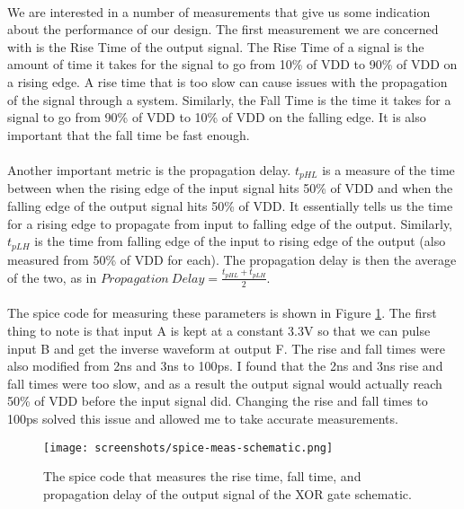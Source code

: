 \documentclass{article}
\begin{document}
  \paragraph{}
  We are interested in a number of measurements that give us some indication about the performance of our design. The first measurement we are concerned with is the Rise Time of the output signal. The Rise Time of a signal is the amount of time it takes for the signal to go from 10\% of VDD to 90\% of VDD on a rising edge. A rise time that is too slow can cause issues with the propagation of the signal through a system. Similarly, the Fall Time is the time it takes for a signal to go from 90\% of VDD to 10\% of VDD on the falling edge. It is also important that the fall time be fast enough. 

  \paragraph{}
  Another important metric is the propagation delay. $t_{pHL}$ is a measure of the time between when the rising edge of the input signal hits 50\% of VDD and when the falling edge of the output signal hits 50\% of VDD. It essentially tells us the time for a rising edge to propagate from input to falling edge of the output. Similarly, $t_{pLH}$ is the time from falling edge of the input to rising edge of the output (also measured from 50\% of VDD for each). The propagation delay is then the average of the two, as in $Propagation\ Delay=\frac{t_{pHL}+t_{pLH}}{2}$.

  \paragraph{}
  The spice code for measuring these parameters is shown in Figure \ref{fig:sch-sim-meas}. The first thing to note is that input A is kept at a constant 3.3V so that we can pulse input B and get the inverse waveform at output F. The rise and fall times were also modified from 2ns and 3ns to 100ps. I found that the 2ns and 3ns rise and fall times were too slow, and as a result the output signal would actually reach 50\% of VDD before the input signal did. Changing the rise and fall times to 100ps solved this issue and allowed me to take accurate measurements. 

  \begin{figure}[H]
    \centering
    \texttt{[image: screenshots/spice-meas-schematic.png]}
    \caption{The spice code that measures the rise time, fall time, and propagation delay of the output signal of the XOR gate schematic.}
    \label{fig:sch-sim-meas}
  \end{figure}
\end{document}
